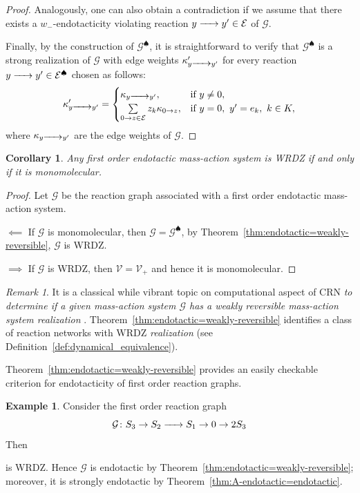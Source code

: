 \documentclass[10pt]{amsart}
\numberwithin{equation}{section}
\theoremstyle{plain}
\newtheorem{corollary}[theorem]{Corollary}
\theoremstyle{definition}
\newtheorem{example}[theorem]{Example}
\theoremstyle{remark}
\newtheorem{remark}[theorem]{Remark}
\newcommand{\cE}{\mathcal{E}}
\newcommand{\cG}{\mathcal{G}}
\newcommand{\cV}{\mathcal{V}}
\begin{document}
\begin{proof}
Analogously, one can also obtain a contradiction if we assume that there exists a $w_-$-endotacticity violating reaction $y\ce{->[]} y'\in\cE$ of $\cG$.
\medskip


Finally, by the construction of $\cG^{\spadesuit}$, it is straightforward to verify that $\cG^{\spadesuit}$ is a strong realization of $\cG$ with edge weights $\kappa_{y\ce{->[]} y'}'$ for every reaction $y\ce{->}y'\in\cE^{\spadesuit}$ chosen as follows:
\[\kappa_{y\ce{->[]} y'}'=\begin{cases}\kappa_{y\ce{->[]} y'},& \text{if}\ y\neq0,\\
\sum\limits_{0\to z\in\cE}z_k\kappa_{0\to z},& \text{if}\ y=0,\ y'=e_k,\ k\in K,\end{cases}\]
where $\kappa_{y\ce{->[]} y'}$ are the edge weights of $\cG$.
\end{proof}

\begin{corollary}\label{cor:WRDZ=monomolecular}
Any first order endotactic mass-action system is WRDZ if and only if it is monomolecular.
\end{corollary}
\begin{proof}
Let $\cG$ be the reaction graph associated with a first  order endotactic mass-action system.
\medskip

\noindent$\impliedby$ If $\cG$ is monomolecular, then $\cG=\cG^{\spadesuit}$, by Theorem~\ref{thm:endotactic=weakly-reversible}, $\cG$ is WRDZ.
\medskip

\noindent$\implies$ If $\cG$ is WRDZ, then $\cV=\cV_+$ and hence it is monomolecular.
\end{proof}

\begin{remark}
It is a classical while vibrant topic on computational aspect of CRN \emph{to determine if a given mass-action system $\cG$ has a weakly reversible mass-action system realization}   \cite{CP08,SHT12,RSHP14,CJY21,CDJ24,CJY23,D23}.  Theorem~\ref{thm:endotactic=weakly-reversible} identifies a class of reaction networks with WRDZ \emph{realization} (see Definition~\ref{def:dynamical_equivalence}).
\end{remark}

Theorem~\ref{thm:endotactic=weakly-reversible} provides an easily checkable criterion for endotacticity of first order reaction graphs.
\begin{example}\label{ex:WRDZ-realization}
Consider the first order reaction graph
\[\cG\colon S_3\to S_2\ce{->[]} S_1\to0\to 2S_3\]
Then
\begin{center}
\end{center}
 is WRDZ. Hence $\cG$ is endotactic by Theorem~\ref{thm:endotactic=weakly-reversible}; moreover, it is strongly endotactic by Theorem~\ref{thm:A-endotactic=endotactic}.
\end{example}
\end{document}
